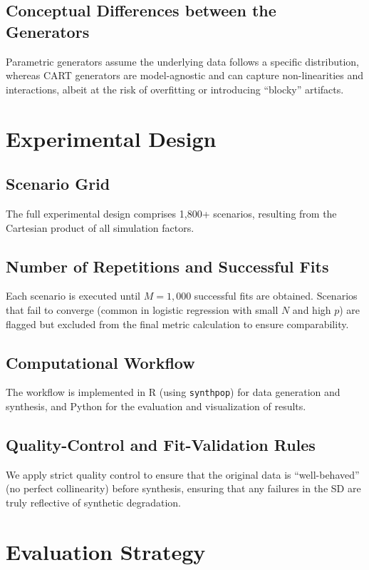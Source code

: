 \subsection{Conceptual Differences between the Generators}
Parametric generators assume the underlying data follows a specific distribution, whereas CART generators are model-agnostic and can capture non-linearities and interactions, albeit at the risk of overfitting or introducing ``blocky'' artifacts.

\section{Experimental Design}
\label{sec:reg-experimental-design}

\subsection{Scenario Grid}
The full experimental design comprises 1,800+ scenarios, resulting from the Cartesian product of all simulation factors.

\subsection{Number of Repetitions and Successful Fits}
Each scenario is executed until $M=1,000$ successful fits are obtained. Scenarios that fail to converge (common in logistic regression with small $N$ and high $p$) are flagged but excluded from the final metric calculation to ensure comparability.

\subsection{Computational Workflow}
The workflow is implemented in R (using \texttt{synthpop}) for data generation and synthesis, and Python for the evaluation and visualization of results.

\subsection{Quality-Control and Fit-Validation Rules}
We apply strict quality control to ensure that the original data is ``well-behaved'' (no perfect collinearity) before synthesis, ensuring that any failures in the SD are truly reflective of synthetic degradation.

\section{Evaluation Strategy}
\label{sec:reg-evaluation}

